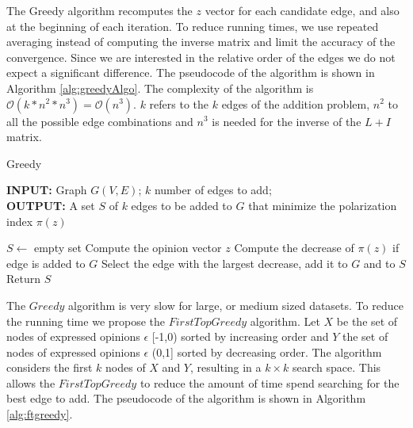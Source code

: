 \noindent The Greedy algorithm recomputes the $z$ vector for each candidate edge, and also at the beginning of each iteration. To reduce running times, we  use repeated averaging instead of computing the inverse matrix and limit the accuracy of the convergence. Since we are interested in the relative order of the edges we do not expect a significant difference. The pseudocode of the algorithm is shown in Algorithm \ref{alg:greedyAlgo}. The complexity of the algorithm is $\mathcal{O}(k * n^2 * n^3) = \mathcal{O}(n^3)$. $k$ refers to the $k$ edges of the addition problem, $n^2$ to all the possible edge combinations and $n^3$ is needed for the inverse of the $L+I$ matrix.
\vspace{20pt}
    		\begin{algorithm}[H]
		
			\caption{Greedy}
			\label{alg:greedyAlgo}
			
			\begin{flushleft}
        				\textbf{INPUT:} Graph $G(V, E)$; $k$ number of edges to add;
				\vspace{6pt} \\
        				\textbf{OUTPUT:} A set $S$ of $k$ edges to be added to $G$ that minimize the polarization \\
				 index $\pi(z)$
			\end{flushleft}
			
			\begin{algorithmic}[1]
				\STATE $S \leftarrow$ empty set 
				\STATE Compute the opinion vector $z$
						\STATE Compute the decrease of $\pi(z)$ if edge is added to $G$
					\ENDFOR
					\STATE Select the edge with the largest decrease, add it to $G$ and to $S$
				\ENDFOR
				\STATE Return $S$
			\end{algorithmic}
		\end{algorithm}
\vspace{20pt}

\noindent The $Greedy$ algorithm is very slow for large, or medium sized datasets. To reduce the running time we propose the $FirstTopGreedy$ algorithm. Let $X$ be the set of nodes of expressed opinions $\epsilon$ [-1,0) sorted by increasing order and $Y$ the set of nodes of expressed opinions $\epsilon$ (0,1] sorted by decreasing order. The algorithm considers the first $k$ nodes of $X$ and $Y$, resulting in  a $k \times k$ search space. This allows the $FirstTopGreedy$ to reduce the amount of time spend searching for the best edge to add. The pseudocode of the algorithm is shown in Algorithm \ref{alg:ftgreedy}. 
\clearpage

